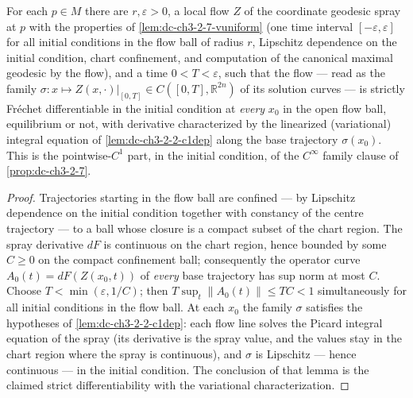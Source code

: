 \begin{lemma}
  \label{lem:dc-ch3-2-7-c1flow}


  For each $p \in M$ there are $r, \varepsilon > 0$, a local flow $Z$ of the
  coordinate geodesic spray at $p$ with the properties of
  \cref{lem:dc-ch3-2-7-vuniform} (one time interval $[-\varepsilon,
  \varepsilon]$ for all initial conditions in the flow ball of radius $r$,
  Lipschitz dependence on the initial condition, chart confinement, and
  computation of the canonical maximal geodesic by the flow), and a time
  $0 < T < \varepsilon$, such that the flow — read as the family
  $\sigma : x \mapsto Z(x, \cdot)|_{[0,T]} \in C([0,T], \mathbb{R}^{2n})$ of
  its solution curves — is strictly Fr\'echet differentiable in the initial
  condition at \emph{every} $x_0$ in the open flow ball, equilibrium or not,
  with derivative characterized by the linearized (variational) integral
  equation of \cref{lem:dc-ch3-2-2-c1dep} along the base trajectory
  $\sigma(x_0)$. This is the pointwise-$C^1$ part, in the initial condition,
  of the $C^\infty$ family clause of \cref{prop:dc-ch3-2-7}.
\end{lemma}
\begin{proof}
  \sketch

  Trajectories starting in the flow ball are confined — by Lipschitz
  dependence on the initial condition together with constancy of the centre
  trajectory — to a ball whose closure is a compact subset of the chart
  region. The spray derivative $dF$ is continuous on the chart region, hence
  bounded by some $C \ge 0$ on the compact confinement ball; consequently the
  operator curve $A_0(t) = dF(Z(x_0, t))$ of \emph{every} base trajectory has
  sup norm at most $C$. Choose $T < \min(\varepsilon, 1/C)$; then
  $T \sup_t \|A_0(t)\| \le T C < 1$ simultaneously for all initial conditions
  in the flow ball. At each $x_0$ the family $\sigma$ satisfies the
  hypotheses of \cref{lem:dc-ch3-2-2-c1dep}: each flow line solves the Picard
  integral equation of the spray (its derivative is the spray value, and the
  values stay in the chart region where the spray is continuous), and
  $\sigma$ is Lipschitz — hence continuous — in the initial condition. The
  conclusion of that lemma is the claimed strict differentiability with the
  variational characterization.
\end{proof}


